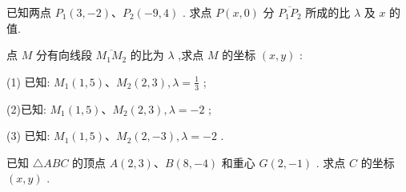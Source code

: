 \documentclass[lang=cn,newtx,12pt,scheme=chinese]{elegantbook}
\begin{document}
\begin{problemset}[练习]

\item 已知两点 \({P}_{1}\left( {3, - 2}\right) \text{、}{P}_{2}\left( {-9,4}\right)\) . 求点 \(P\left( {x,0}\right)\) 分 \(\overline{{P}_{1}{P}_{2}}\) 所成的比 \(\lambda\) 及 \(x\) 的值.

\item 点 \(M\) 分有向线段 \(\overline{{M}_{1}{M}_{2}}\) 的比为 \(\lambda\) ,求点 \(M\) 的坐标 \(\left( {x,y}\right)\) :

(1) 已知: \({M}_{1}\left( {1,5}\right) \text{、}{M}_{2}\left( {2,3}\right) ,\lambda = \frac{1}{3}\) ;

(2)已知: \({M}_{1}\left( {1,5}\right) \text{、}{M}_{2}\left( {2,3}\right) ,\lambda = - 2\) ;

(3) 已知: \({M}_{1}\left( {1,5}\right) \text{、}{M}_{2}\left( {2, - 3}\right) ,\lambda = - 2\) .

\item 已知 \(\bigtriangleup {ABC}\) 的顶点 \(A\left( {2,3}\right) \text{、}B\left( {8, - 4}\right)\) 和重心 \(G\left( {2, - 1}\right)\) . 求点 \(C\) 的坐标 \(\left( {x,y}\right)\) .

\end{problemset}
\end{document}
